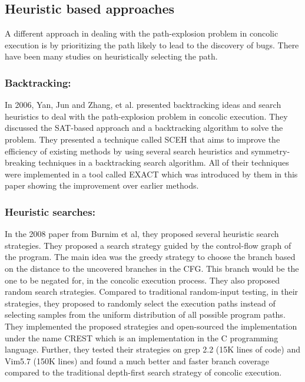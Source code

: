 \documentclass[ runningheads,
               a4paper]{llncs}
\begin{document}


\subsection{Heuristic based approaches}
A different approach in dealing with the path-explosion problem in concolic execution is by prioritizing the path likely to lead to the discovery of bugs. There have been many studies on heuristically selecting the path.


\subsubsection{Backtracking:}
In 2006, Yan, Jun and Zhang, et al. presented \cite{yan2006backtracking} backtracking ideas and search heuristics to deal with the path-explosion problem in concolic execution. They discussed the SAT-based approach and a backtracking algorithm to solve the problem. They presented a technique called SCEH that aims to improve the efficiency of existing methods by using several search heuristics and symmetry-breaking techniques in a backtracking search algorithm. All of their techniques were implemented in a tool called EXACT which was introduced by them in this paper showing the improvement over earlier methods.


\subsubsection{Heuristic searches:}
In the 2008 paper \cite{kousik2008heuristic} from Burnim et al, they proposed several heuristic search strategies. They proposed a search strategy guided by the control-flow graph of the program. The main idea was the greedy strategy to choose the branch based on the distance to the uncovered branches in the CFG. This branch would be the one to be negated for, in the concolic execution process. They also proposed random search strategies. Compared to traditional random-input testing, in their strategies, they proposed to randomly select the execution paths instead of selecting samples from the uniform distribution of all possible program paths. They implemented the proposed strategies and open-sourced the implementation under the name CREST which is an implementation in the C programming language. Further, they tested their strategies on grep 2.2 (15K lines of code) and Vim5.7 (150K lines) and found a much better and faster branch coverage compared to the traditional depth-first search strategy of concolic execution.
\end{document}
